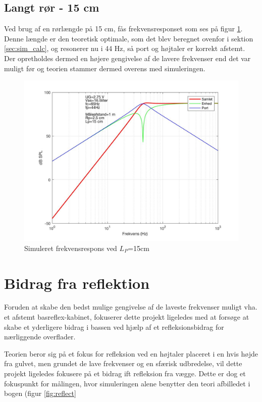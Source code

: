 \subsection{Langt rør - 15 cm}

Ved brug af en rørlængde på 15 cm, fås frekvensresponset som ses på figur \ref{fig:sim_langt}. \\
Denne længde er den teoretisk optimale, som det blev beregnet ovenfor i sektion \ref{sec:sim_calc}, og resonerer nu i 44 Hz, så port og højtaler er korrekt afstemt. 
Der opretholdes dermed en højere gengivelse af de lavere frekvenser end det var muligt før og teorien stammer dermed overens med simuleringen. 

\begin{figure}[h!]
	\centering
	\includegraphics[width=.8\textwidth]{Pics/sim_lang}
	\caption{Simuleret frekvensrespons ved $L_P$=15cm } 
	\label{fig:sim_langt}
\end{figure}


\section{Bidrag fra reflektion}
\label{sec:reflection}
Foruden at skabe den bedst mulige gengivelse af de laveste frekvenser muligt vha. et afstemt basreflex-kabinet, fokuserer dette projekt ligeledes med at forsøge at skabe et yderligere bidrag i bassen ved hjælp af et refleksionsbidrag for nærliggende overflader. 

Teorien beror sig på et fokus for refleksion ved en højtaler placeret i en hvis højde fra gulvet, men grundet de lave frekvenser og en sfærisk udbredelse, vil dette projekt ligeledes fokusere på et bidrag ift refleksion fra vægge. 
Dette er dog et fokuspunkt for målingen, hvor simuleringen alene benytter den teori afbilledet i bogen (figur \ref{fig:reflect}


